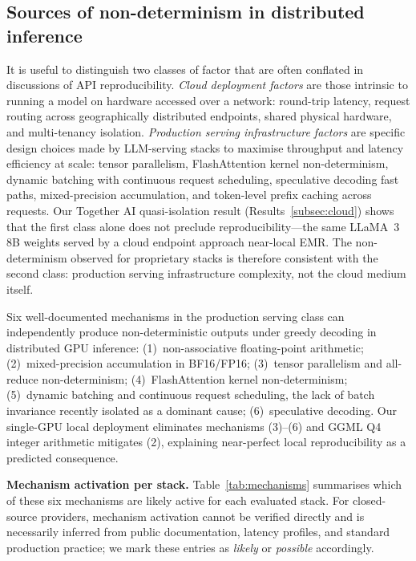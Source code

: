 \documentclass[sn-nature]{sn-jnl}
\begin{document}
\subsection{Sources of non-determinism in distributed inference}\label{subsec:sources}

It is useful to distinguish two classes of factor that are often conflated in discussions of API reproducibility.
\emph{Cloud deployment factors} are those intrinsic to running a model on hardware accessed over a network: round-trip latency, request routing across geographically distributed endpoints, shared physical hardware, and multi-tenancy isolation.
\emph{Production serving infrastructure factors} are specific design choices made by LLM-serving stacks to maximise throughput and latency efficiency at scale: tensor parallelism, FlashAttention kernel non-determinism, dynamic batching with continuous request scheduling, speculative decoding fast paths, mixed-precision accumulation, and token-level prefix caching across requests.
Our Together AI quasi-isolation result (Results~\ref{subsec:cloud}) shows that the first class alone does not preclude reproducibility---the same LLaMA~3 8B weights served by a cloud endpoint approach near-local EMR.
The non-determinism observed for proprietary stacks is therefore consistent with the second class: production serving infrastructure complexity, not the cloud medium itself.

Six well-documented mechanisms in the production serving class can independently produce non-deterministic outputs under greedy decoding in distributed GPU inference:
(1)~non-associative floating-point arithmetic\cite{higham2002accuracy};
(2)~mixed-precision accumulation in BF16/FP16\cite{yuan2025nondeterminism};
(3)~tensor parallelism and all-reduce non-determinism\cite{shoeybi2019megatron};
(4)~FlashAttention kernel non-determinism\cite{dao2022flashattention};
(5)~dynamic batching and continuous request scheduling, the lack of batch invariance recently isolated as a dominant cause\cite{kwon2023vllm,he2025nondeterminism};
(6)~speculative decoding\cite{leviathan2023speculative}.
Our single-GPU local deployment eliminates mechanisms (3)--(6) and GGML Q4 integer arithmetic mitigates (2), explaining near-perfect local reproducibility as a predicted consequence.

\textbf{Mechanism activation per stack.}
Table~\ref{tab:mechanisms} summarises which of these six mechanisms are likely active for each evaluated stack.
For closed-source providers, mechanism activation cannot be verified directly and is necessarily inferred from public documentation, latency profiles, and standard production practice; we mark these entries as \emph{likely} or \emph{possible} accordingly.
\end{document}
